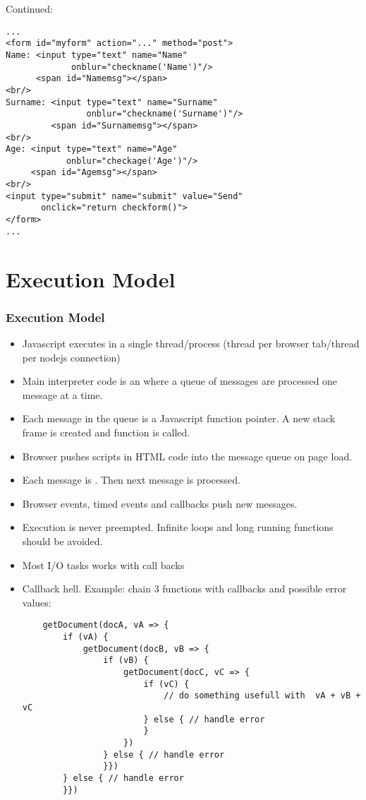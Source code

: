 \documentclass[trans,compress,xcolor=table]{beamer}
\begin{document}
\begin{frame}[fragile]
Continued:
\begin{lstlisting}
...
<form id="myform" action="..." method="post">
Name: <input type="text" name="Name" 
             onblur="checkname('Name')"/>
      <span id="Namemsg"></span>
<br/>
Surname: <input type="text" name="Surname" 
                onblur="checkname('Surname')"/>
         <span id="Surnamemsg"></span>
<br/>
Age: <input type="text" name="Age" 
            onblur="checkage('Age')"/>
     <span id="Agemsg"></span>
<br/>
<input type="submit" name="submit" value="Send" 
       onclick="return checkform()">
</form>
...
\end{lstlisting}
\end{frame}

\section{Execution Model}
\begin{frame}
\frametitle{Execution Model}
\begin{itemize}
\item Javascript executes in a single thread/process (thread per browser tab/thread per nodejs connection)
\item Main interpreter code is an  where a queue of messages are processed one message at a time. 
\item Each message in the queue is a Javascript function pointer. A new stack frame is created and function is called.
\item Browser pushes scripts in HTML code into the message queue on page load.
\item Each message is . Then next message is processed.
\item Browser events, timed events and callbacks push new messages.
\end{itemize}
\end{frame}

\begin{frame}[fragile]
\begin{itemize}
\item Execution is never preempted. Infinite loops and long running functions should be avoided.
\item Most I/O tasks works with call backs
\item Callback hell. Example: chain 3 functions with callbacks and possible error values:
\begin{lstlisting}
	getDocument(docA, vA => {
		if (vA) {
			getDocument(docB, vB => {
				if (vB) {
					getDocument(docC, vC => {
						if (vC) {
							// do something usefull with  vA + vB + vC
						} else { // handle error 
						}
					})
				} else { // handle error 
				}})
		} else { // handle error
		}})
\end{lstlisting}
\end{itemize}
\end{frame}
\end{document}
